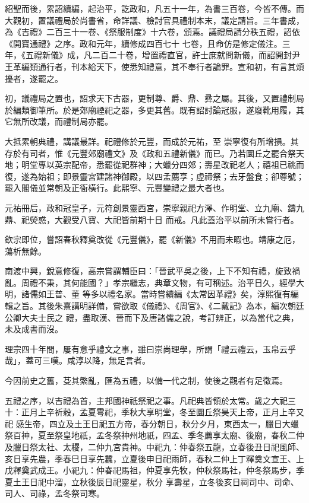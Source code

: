 \begin{pinyinscope}
 紹聖而後，累詔續編，起治平，訖政和，凡五十一年，為書三百卷，今皆不傳。而大觀初，置議禮局於尚書省，命詳議、檢討官具禮制本末，議定請旨。三年書成，為《吉禮》二百三十一卷、《祭服制度》十六卷，頒焉。議禮局請分秩五禮，詔依《開寶通禮》之序。政和元年，續修成四百七十
 七卷，且命仿是修定儀注。三年，《五禮新儀》成，凡二百二十卷，增置禮直官，許士庶就問新儀，而詔開封尹王革編類通行者，刊本給天下，使悉知禮意，其不奉行者論罪。宣和初，有言其煩擾者，遂罷之。



 初，議禮局之置也，詔求天下古器，更制尊、爵、鼎、彞之屬。其後，又置禮制局於編類御筆所。於是郊廟禋祀之器，多更其舊。既有詔討論冠服，遂廢靴用履，其它無所改議，而禮制局亦罷。



 大抵累朝典禮，講議最詳。祀禮修於元豐，而成於元祐，至
 崇寧復有所增損。其存於有司者，惟《元豐郊廟禮文》及《政和五禮新儀》而已。乃若圜丘之罷合祭天地；明堂專以英宗配帝，悉罷從祀群神；大蠟分四郊；壽星改祀老人；禧祖已祧而復，遂為始祖；即景靈宮建諸神御殿，以四孟薦享；虛禘祭；去牙盤食；卻尊號；罷入閣儀並常朝及正衙橫行。此熙寧、元豐變禮之最大者也。



 元祐冊后，政和冠皇子，元符創景靈西宮，崇寧親祀方澤、作明堂、立九廟、鑄九鼎、祀熒惑，大觀受八寶、大祀皆前期十日
 而戒。凡此蓋治平以前所未嘗行者。



 欽宗即位，嘗詔春秋釋奠改從《元豐儀》，罷《新儀》不用而未暇也。靖康之厄，蕩析無餘。


南渡中興，銳意修復，高宗嘗謂輔臣曰：「晉武平吳之後，上下不知有禮，旋致禍亂。周禮不秉，其何能國？」孝宗繼志，典章文物，有可稱述。治平日久，經學大明，諸儒如王普、董
 等多以禮名家。當時嘗續編《太常因革禮》矣，淳熙復有編輯之旨。其後朱熹講明詳備，嘗欲取《儀禮》、《周官》、《二戴記》為本，編次朝廷公卿大夫士民之
 禮，盡取漢、晉而下及唐諸儒之說，考訂辨正，以為當代之典，未及成書而沒。



 理宗四十年間，屢有意乎禮文之事，雖曰崇尚理學，所謂「禮云禮云，玉帛云乎哉」，蓋可三嘆。咸淳以降，無足言者。



 今因前史之舊，芟其繁亂，匯為五禮，以備一代之制，使後之觀者有足徵焉。



 五禮之序，以吉禮為首，主邦國神祇祭祀之事。凡祀典皆領於太常。歲之大祀三十：正月上辛祈穀，孟夏雩祀，季秋大享明堂，冬至圜丘祭昊天上帝，正月上辛又祀
 感生帝，四立及土王日祀五方帝，春分朝日，秋分夕月，東西太一，臘日大蠟祭百神，夏至祭皇地祇，孟冬祭神州地祇，四孟、季冬薦享太廟、後廟，春秋二仲及臘日祭太社、太稷，二仲九宮貴神。中祀九：仲春祭五龍，立春後丑日祀風師、亥日享先農，季春巳日享先蠶，立夏後申日祀雨師，春秋二仲上丁釋奠文宣王、上戊釋奠武成王。小祀九：仲春祀馬祖，仲夏享先牧，仲秋祭馬社，仲冬祭馬步，季夏土王日祀中溜，立秋後辰日祀靈星，秋分
 享壽星，立冬後亥日祠司中、司命、司人、司祿，孟冬祭司寒。




\end{pinyinscope}
